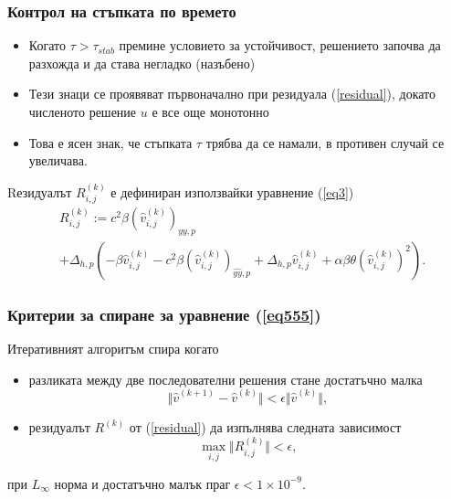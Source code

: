 \documentclass{beamer}
\newcommand{\rf}[1]{(\ref{#1})}
\begin{document}
\begin{frame}
\frametitle{Контрол на стъпката по времето}

\begin{itemize}
  \item Когато $\tau > \tau_{stab}$ премине условието за устойчивост, решението започва да разхожда и да става негладко (назъбено)

  \item Тези знаци се проявяват първоначално при резидуала \rf{residual}, докато численото решение $u$ е все още монотонно

  \item Това е ясен знак, че стъпката $\tau$ трябва да се намали, в противен случай се увеличава.
\end{itemize}
Rезидуалът $R_{i,j}^{(k)}$ е дефиниран използвайки уравнение \rf{eq3}
\begin{align}\label{residual}
&R_{i,j}^{(k)} := 
c^2\beta (\widehat{v}^{(k)}_{i,j})_{\widehat{yy},p}  \nonumber \\
&+ \Delta_{h,p}(-\beta \widehat{v}^{(k)}_{i,j} - c^2\beta (\widehat{v}^{(k)}_{i,j})_{\widehat{yy},p} + \Delta_{h,p} \widehat{v}^{(k)}_{i,j} 
+ \alpha \beta \theta (\widehat{v}^{(k)}_{i,j})^2  ).
\end{align}

\end{frame}

\begin{frame}
\frametitle{Критерии за спиране за уравнение \rf{eq555}}

Итеративният алгоритъм спира когато
\begin{itemize}
  \item разликата между две последователни решения стане достатъчно малка
	\begin{equation*}
	\Vert \widehat{v}^{(k+1)}-\widehat{v}^{(k)}\Vert  < \epsilon \Vert \widehat{v}^{(k)}\Vert ,
	\end{equation*}
\end{itemize}


\begin{itemize}
  \item резидуалът $R^{(k)}$ от \rf{residual} да изпълнява следната зависимост
	\begin{equation}\label{crit2}
	\max_{i,j} \Vert R_{i,j}^{(k)} \Vert < \epsilon,
	\end{equation}
\end{itemize}
при $L_\infty$ норма и достатъчно малък праг $\epsilon < 1\times10^{-9}$.

\end{frame}
\end{document}
